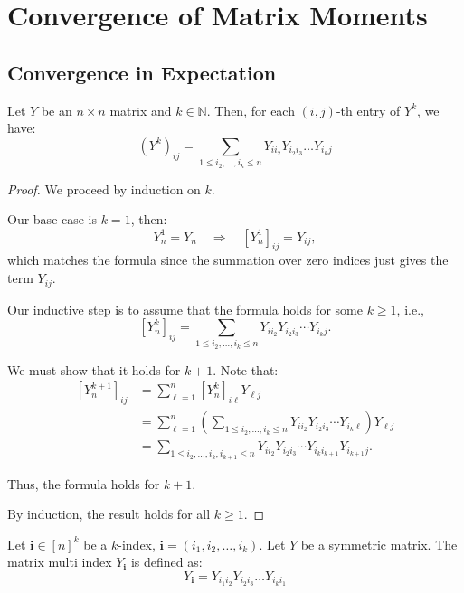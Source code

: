 \chapter{Convergence of Matrix Moments}

\section{Convergence in Expectation}


\begin{lemma}
    \label{lem:matrix_powers_entries}
    Let $Y$ be an $n\times n$ matrix and $k \in \mathbb{N}$. Then, for each  $(i, j)$-th
    entry of $Y^{k}$, we have:
    $$
    (Y^{k})_{ij} = \sum_{1 \leq i_2, \ldots ,i_{k} \leq n} Y_{ii_{2}} Y_{i_{2}i_{3}}\ldots Y_{i_{k}j}
    $$
\end{lemma}

\begin{proof}
  We proceed by induction on $k$.

  Our base case is $k=1$, then:
  $$
  Y_n^1 = Y_n \quad \Rightarrow \quad [Y_n^1]_{ij} = Y_{ij},
  $$
  which matches the formula since the summation over zero indices just gives the term $Y_{ij}$.

  Our inductive step is to assume that the formula holds for some $k \ge 1$, i.e.,
  $$
  \left[Y_n^k\right]_{ij} = \sum_{1 \le i_2, \dots, i_k \le n} Y_{i i_2} Y_{i_2 i_3} \cdots Y_{i_k j}.
  $$

  We must show that it holds for $k + 1$. Note that:
  \begin{align*}
  \left[Y_n^{k+1}\right]_{ij}
  &= \sum_{\ell = 1}^n \left[Y_n^k\right]_{i\ell} Y_{\ell j} \\
  &= \sum_{\ell = 1}^n \left( \sum_{1 \le i_2, \dots, i_k \le n} Y_{i i_2} Y_{i_2 i_3} \cdots Y_{i_k \ell} \right) Y_{\ell j} \\
  &= \sum_{1 \le i_2, \dots, i_k, i_{k+1} \le n} Y_{i i_2} Y_{i_2 i_3} \cdots Y_{i_k i_{k+1}} Y_{i_{k+1} j}.
  \end{align*}

  Thus, the formula holds for $k + 1$.

  By induction, the result holds for all $k \ge 1$.
\end{proof}



\begin{definition}
    \label{def:matrix_multi_index}
    Let $\mathbf{i} \in[n]^k$ be a $k$-index, $\mathbf{i}=\left(i_1, i_2, \ldots, i_k\right)$.
    Let $Y$ be a symmetric matrix. The matrix multi index $Y_{\mathbf{i}}$ is defined as:
    $$
    Y_{\mathbf{i}} = Y_{i_{1}i_{2}} Y_{i_{2}i_{3}} \ldots Y_{i_{k}i_{1}}
    $$
\end{definition}

